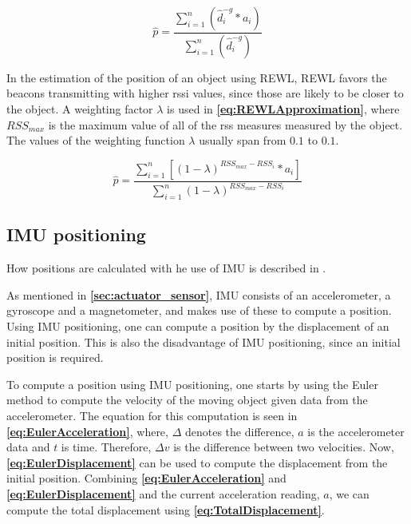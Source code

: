 \begin{equation} \label{eq:WCLApproximaion}
    \hat{p} = \frac{\sum_{i = 1}^{n} (\hat{d}_i^{-g} * a_i)}{\sum_{i = 1}^{n} (\hat{d}_i^{-g})}
\end{equation}

In the estimation of the position of an object using REWL, REWL favors the beacons transmitting with higher \gls{rssi} values, since those are likely to be closer to the object. A weighting factor $\lambda$ is used in \textbf{\autoref{eq:REWLApproximation}}, where $RSS_{max}$ is the maximum value of all of the \gls{rss} measures measured by the object. The values of the weighting function $\lambda$ usually span from $0.1$ to $0.1$.

\begin{equation} \label{eq:REWLApproximation}
    \hat{p} = \frac{\sum_{i = 1}^{n} [(1 - \lambda)^{RSS_{max} - RSS_{i}} * a_i]}{\sum_{i = 1}^{n} (1 - \lambda)^{RSS_{max} - RSS_{i}}}
\end{equation}

\subsection{IMU positioning} \label{sec:IMUPositioning} %
How positions are calculated with he use of IMU is described in \cite{IMUPositioning}.

As mentioned in \textbf{\autoref{sec:actuator_sensor}}, IMU consists of an accelerometer, a gyroscope and a magnetometer, and makes use of these to compute a position. Using IMU positioning, one can compute a position by the displacement of an initial position. This is also the disadvantage of IMU positioning, since an initial position is required.

To compute a position using IMU positioning, one starts by using the Euler method to compute the velocity of the moving object given data from the accelerometer. The equation for this computation is seen in \textbf{\autoref{eq:EulerAcceleration}}, where, $\Delta$ denotes the difference, $a$ is the accelerometer data and $t$ is time. Therefore, $\Delta v$ is the difference between two velocities. Now, \textbf{\autoref{eq:EulerDisplacement}} can be used to compute the displacement from the initial position. Combining \textbf{\autoref{eq:EulerAcceleration}} and \textbf{\autoref{eq:EulerDisplacement}} and the current acceleration reading, $a$, we can compute the total displacement using \textbf{\autoref{eq:TotalDisplacement}}.

